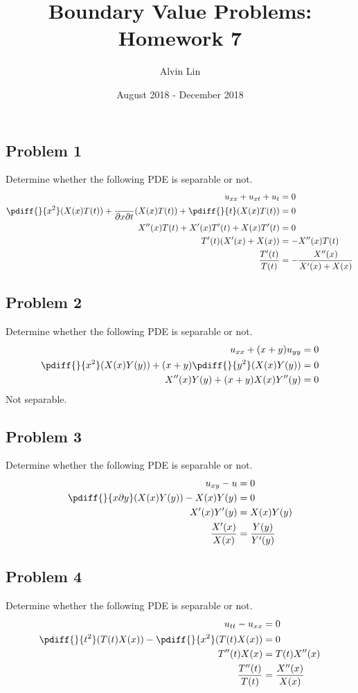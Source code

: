 \documentclass{math}
\title{Boundary Value Problems: Homework 7}
\author{Alvin Lin}
\date{August 2018 - December 2018}
\begin{document}
\maketitle

\subsection*{Problem 1}
Determine whether the following PDE is separable or not.
\begin{align*}
  u_{xx}+u_{xt}+u_t &= 0 \\
  \pdiff{}{x^2}(X(x)T(t))+\frac{}{\partial{x}\partial{t}}(X(x)T(t))+
    \pdiff{}{t}(X(x)T(t)) &= 0 \\
  X''(x)T(t)+X'(x)T'(t)+X(x)T'(t) &= 0 \\
  T'(t)(X'(x)+X(x)) &= -X''(x)T(t) \\
  \frac{T'(t)}{T(t)} &= -\frac{X''(x)}{X'(x)+X(x)}
\end{align*}

\subsection*{Problem 2}
Determine whether the following PDE is separable or not.
\begin{align*}
  u_{xx}+(x+y)u_{yy} &= 0 \\
  \pdiff{}{x^2}(X(x)Y(y))+(x+y)\pdiff{}{y^2}(X(x)Y(y)) &= 0 \\
  X''(x)Y(y)+(x+y)X(x)Y''(y) &= 0
\end{align*}
Not separable.

\subsection*{Problem 3}
Determine whether the following PDE is separable or not.
\begin{align*}
  u_{xy}-u &= 0 \\
  \pdiff{}{x\partial{y}}(X(x)Y(y))-X(x)Y(y) &= 0 \\
  X'(x)Y'(y) &= X(x)Y(y) \\
  \frac{X'(x)}{X(x)} &= \frac{Y(y)}{Y'(y)}
\end{align*}

\subsection*{Problem 4}
Determine whether the following PDE is separable or not.
\begin{align*}
  u_{tt}-u_{xx} &= 0 \\
  \pdiff{}{t^2}(T(t)X(x))-\pdiff{}{x^2}(T(t)X(x)) &= 0 \\
  T''(t)X(x) &= T(t)X''(x) \\
  \frac{T''(t)}{T(t)} &= \frac{X''(x)}{X(x)}
\end{align*}
\end{document}
